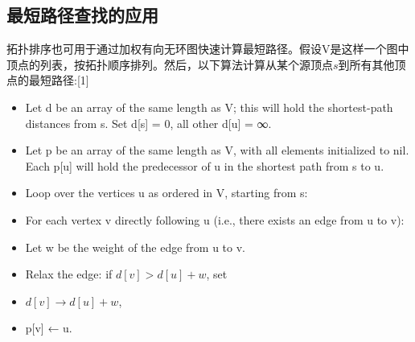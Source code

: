 \subsection{最短路径查找的应用}
拓扑排序也可用于通过加权有向无环图快速计算最短路径。假设V是这样一个图中顶点的列表，按拓扑顺序排列。然后，以下算法计算从某个源顶点$s$到所有其他顶点的最短路径:[1]
\begin{itemize}
\item Let d be an array of the same length as V; this will hold the shortest-path distances from s. Set d[s] = 0, all other d[u] = ∞.
\item Let p be an array of the same length as V, with all elements initialized to nil. Each p[u] will hold the predecessor of u in the shortest path from s to u.
\item Loop over the vertices u as ordered in V, starting from s:
\item For each vertex v directly following u (i.e., there exists an edge from u to v):
\item Let w be the weight of the edge from u to v.
\item Relax the edge: if $d[v] > d[u] + w$, set
\item $d[v] \to d[u] + w$,
\item p[v] ← u.
\end{itemize}
